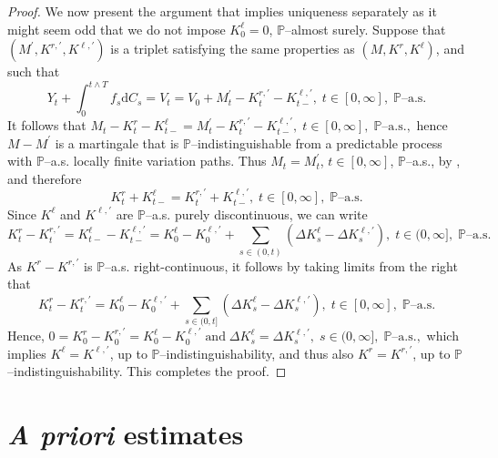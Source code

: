 \documentclass[10pt]{article} %
\def \P{\mathbb{P}}
\newcommand{\1}{\mathbf{1}}
\def\d{\mathrm{d}}
\begin{document}
\begin{proof}
	\medskip
	We now present the argument that implies uniqueness separately as it might seem odd that we do not impose $K^\ell_0 = 0$, $\P$--almost surely. Suppose that $(M^\prime,K^{r,\prime},K^{\ell,\prime})$ is a triplet satisfying the same properties as $(M,K^r,K^\ell)$, and such that
	\begin{equation*}
		Y_t + \int_0^{t \land T} f_s \d C_s = V_t = V_0 +M^\prime_t - K^{r,\prime}_t - K^{\ell,\prime}_{t-}, \; t \in [0,\infty], \; \text{$\P$--a.s.}
	\end{equation*}
	It follows that $M_t - K^r_t - K^\ell_{t-} = M^\prime_t - K^{r,\prime}_t - K^{\ell,\prime}_{t-}, \; t \in [0,\infty], \; \text{$\P$--a.s.},$ hence $M-M^\prime$ is a martingale that is $\P$--indistinguishable from a predictable process with $\P$--a.s. locally finite variation paths. Thus  $M_t = M^\prime_t$, $t \in [0,\infty]$, $\P$--a.s., by \cite[Corollary I.3.16]{jacod2003limit}, and therefore
	\begin{equation*}
		K^r_t + K^\ell_{t-} = K^{r,\prime}_t + K^{\ell,\prime}_{t-}, \; t \in [0,\infty], \; \text{$\P$--a.s.}
	\end{equation*}
	Since $K^\ell$ and $K^{\ell,\prime}$ are $\P$--a.s. purely discontinuous, we can write
	\begin{equation*}
		K^r_t - K^{r,\prime}_t = K^\ell_{t-} - K^{\ell,\prime}_{t-} = K^\ell_0 - K^{\ell,\prime}_0 + \sum_{s \in (0,t)} (\Delta K^\ell_s - \Delta K^{\ell,\prime}_s), \; t \in (0,\infty], \; \text{$\P$--a.s.}
	\end{equation*}
	As $K^r - K^{r,\prime}$ is $\P$--a.s. right-continuous, it follows by taking limits from the right that
	\begin{equation*}
		K^r_t - K^{r,\prime}_t = K^\ell_0 - K^{\ell,\prime}_0 + \sum_{s \in (0,t]} (\Delta K^\ell_s - \Delta K^{\ell,\prime}_s), \; t \in [0,\infty], \; \text{$\P$--a.s.}
	\end{equation*}
	Hence, $0 = K^r_0 - K^{r,\prime}_0 = K^\ell_0 - K^{\ell,\prime}_0 \; \text{and} \; \Delta K^\ell_s = \Delta K^{\ell,\prime}_s, \; s \in (0,\infty], \; \text{$\P$--a.s.},$ which implies $K^\ell = K^{\ell,\prime}$, up to $\P$--indistinguishability, and thus also $K^r = K^{r,\prime}$, up to $\P$--indistinguishability. This completes the proof.
\end{proof}


\section{\emph{A priori} estimates}\label{sec::a_priori}
\end{document}
